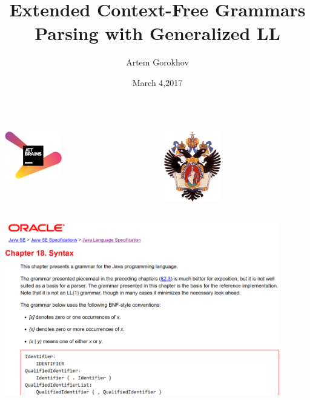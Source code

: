 \documentclass{beamer}
\title[]{Extended Context-Free Grammars Parsing with Generalized LL}
\institute[SPbU]{ 
	Saint Petersburg University \\ 
	Programming Languages and Tools Lab, JetBrains}
\author[Artem Gorokhov]{Artem Gorokhov}
\date{March 4,2017}
\begin{document}
 
	
	
	\begin{frame} 
		\begin{columns} 
			\begin{column}{6.1cm}
				\begin{center} 
					{\includegraphics[width=2.5cm]{pictures/jetbrains_logo.jpg}} 
				\end{center}
			\end{column}
			\begin{column}{6.1cm}
				\begin{center} 
					{\includegraphics[width=2.5cm]{pictures/SPbGU_Logo.png}} 
				\end{center}
			\end{column}
			\end{columns}
		 
		\titlepage 
	\end{frame}

	\begin{frame}
		\begin{center} 
			{\includegraphics[width=12cm]{pictures/java_grammar.png}} 
		\end{center}
	\end{frame}
\end{document}
